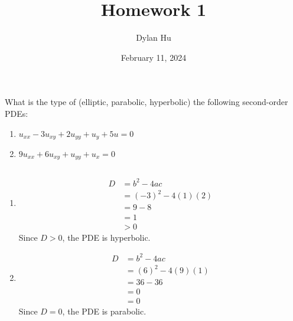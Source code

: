 \documentclass[plain]{pset}
\title{Homework 1}
\author{Dylan Hu}
\date{February 11, 2024}
\begin{document}
\maketitle

\pagebreak

\begin{problem}
What is the type of (elliptic, parabolic, hyperbolic) the following second-order PDEs:
\begin{enumerate}[label = (\alph*)]
    \item \(u_{xx} - 3u_{xy} + 2u_{yy} + u_y + 5u = 0\)
    \item \(9u_{xx}+ 6u_{xy} + u_{yy} + u_x = 0\)
\end{enumerate}
\end{problem}
\begin{solution}
    \[\]
    \vspace*{-4em}
    \begin{enumerate}[label = (\alph*)]
        \item
              \begin{align*}
                  D & = b^2 - 4ac        \\
                    & = (-3)^2 - 4(1)(2) \\
                    & = 9 - 8            \\
                    & = 1                \\
                    & > 0
              \end{align*}
              Since \(D > 0\), the PDE is hyperbolic.
        \item \begin{align*}
                  D & = b^2 - 4ac       \\
                    & = (6)^2 - 4(9)(1) \\
                    & = 36 - 36         \\
                    & = 0               \\
                    & = 0
              \end{align*}
              Since \(D = 0\), the PDE is parabolic.
    \end{enumerate}
\end{solution}

\pagebreak
\end{document}
